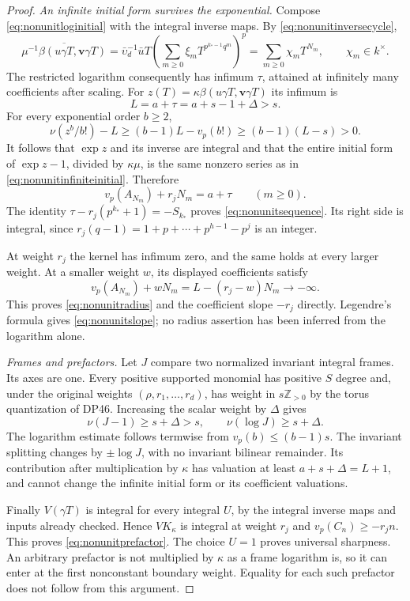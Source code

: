\documentclass[11pt,a4paper]{article}
\theoremstyle{definition}\newtheorem{remark}[theorem]{Remark}
\newcommand{\Z}{\mathbb Z}\newcommand{\Q}{\mathbb Q}\newcommand{\F}{\mathbb F}
\newcommand{\vp}{v_p}\newcommand{\dR}{\mathrm{dR}}\newcommand{\crys}{\mathrm{crys}}
\begin{document}
\begin{proof}
\emph{An infinite initial form survives the exponential.}
Compose \eqref{eq:nonunitloginitial} with the integral inverse maps.
By \eqref{eq:nonunitinversecycle},
\begin{equation}\label{eq:nonunitinfiniteinitial}
 \overline{\mu^{-1}\beta(u\gamma T,\mathbf v\gamma T)}
 =\bar\upsilon_d^{-1}\bar uT
   \left(\sum_{m\ge0}\xi_mT^{p^{k_*-1}q^m}\right)^p
 =\sum_{m\ge0}\chi_mT^{N_m},
 \qquad\chi_m\in k^\times.
\end{equation}
The restricted logarithm consequently has infimum $\tau$, attained at infinitely many coefficients after scaling.
For $z(T)=\kappa\beta(u\gamma T,\mathbf v\gamma T)$ its infimum is
\[
 L=a+\tau=a+s-1+\Delta>s.
\]
For every exponential order $b\ge2$,
\[
 \nu(z^b/b!)-L
       \ge(b-1)L-\vp(b!)
       \ge(b-1)(L-s)>0.
\]
It follows that $\exp z$ and its inverse are integral and that the entire initial form of $\exp z-1$, divided by $\kappa\mu$, is the same nonzero series as in \eqref{eq:nonunitinfiniteinitial}. Therefore
\[
 \vp(A_{N_m})+r_jN_m=a+\tau
       \qquad(m\ge0).
\]
The identity $\tau-r_j(p^{k_*}+1)=-S_{k_*}$ proves
\eqref{eq:nonunitsequence}. Its right side is integral, since
$r_j(q-1)=1+p+\cdots+p^{h-1}-p^j$ is an integer.

At weight $r_j$ the kernel has infimum zero, and the same holds at every larger weight. At a smaller weight $w$, its displayed coefficients satisfy
\[
 \vp(A_{N_m})+wN_m=L-(r_j-w)N_m\longrightarrow-\infty.
\]
This proves \eqref{eq:nonunitradius} and the coefficient slope $-r_j$ directly. Legendre's formula gives \eqref{eq:nonunitslope}; no radius assertion has been inferred from the logarithm alone.

\emph{Frames and prefactors.}
Let $J$ compare two normalized invariant integral frames.
Its axes are one. Every positive supported monomial has positive $S$ degree and, under the original weights $(\rho,r_1,\ldots,r_d)$, has weight in $s\Z_{>0}$ by the torus quantization of DP46.
Increasing the scalar weight by $\Delta$ gives
\[
 \nu(J-1)\ge s+\Delta>s,\qquad
 \nu(\log J)\ge s+\Delta.
\]
The logarithm estimate follows termwise from $\vp(b)\le(b-1)s$.
The invariant splitting changes by $\pm\log J$, with no invariant bilinear remainder. Its contribution after multiplication by $\kappa$ has valuation at least
$a+s+\Delta=L+1$, and cannot change the infinite initial form or its coefficient valuations.

Finally $V(\gamma T)$ is integral for every integral $U$, by the integral inverse maps and inputs already checked. Hence $V K_\kappa$ is integral at weight $r_j$ and
$\vp(C_n)\ge-r_jn$. This proves \eqref{eq:nonunitprefactor}.
The choice $U=1$ proves universal sharpness. An arbitrary prefactor is not multiplied by $\kappa$ as a frame logarithm is, so it can enter at the first nonconstant boundary weight. Equality for each such prefactor does not follow from this argument.
\end{proof}
\end{document}
